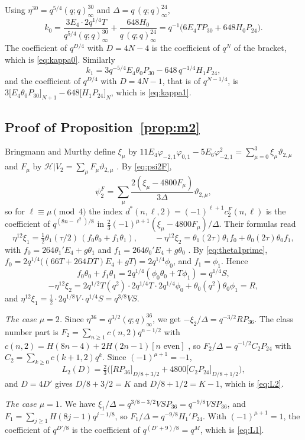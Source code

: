 \documentclass[11pt]{amsart}
\theoremstyle{definition}
\newcommand{\vt}{\vartheta}
\newcommand{\coef}[2]{\big[#1\big]_{#2}}
\begin{document}
Using $\eta^{30}=q^{5/4}(q;q)_\infty^{30}$ and $\Delta=q\,(q;q)_\infty^{24}$,
\[
k_0=\frac{3E_4\cdot2q^{1/4}T}{q^{5/4}(q;q)^{30}_\infty}+\frac{648H_0}{q\,(q;q)^{24}_\infty}=q^{-1}\big(6E_4TP_{30}+648H_0P_{24}\big).
\]
The coefficient of $q^{D/4}$ with $D=4N-4$ is the coefficient of $q^{N}$ of the bracket, which is \eqref{eq:kappa0}. Similarly
\[
k_1=3q^{-5/4}E_4\theta_0P_{30}-648\,q^{-1/4}H_1P_{24},
\]
and the coefficient of $q^{D/4}$ with $D=4N-1$, that is of $q^{N-1/4}$, is $3\coef{E_4\theta_0P_{30}}{N+1}-648\coef{H_1P_{24}}{N}$, which is \eqref{eq:kappa1}.

\subsection{Proof of Proposition~\ref{prop:m2}}
Bringmann and Murthy define $\xi_\mu$ by $11E_4\varphi_{-2,1}\varphi_{0,1}-5E_6\varphi_{-2,1}^2=\sum_{\mu=0}^3\xi_\mu\vt_{2,\mu}$ and $F_\mu$ by $\mathcal H|V_2=\sum_\mu F_\mu\vt_{2,\mu}$ \cite[(5.11), (6.1)]{BM13}. By \eqref{eq:psi2F},
\[
\psi_2^F=\sum_\mu\frac{2(\xi_\mu-4800F_\mu)}{3\Delta}\vt_{2,\mu},
\]
so for $\ell\equiv\mu\pmod4$ the index $d^*(n,\ell,2)=(-1)^{\ell+1}c^F_2(n,\ell)$ is the coefficient of $q^{(8n-\ell^2)/8}$ in $\frac23(-1)^{\mu+1}(\xi_\mu-4800F_\mu)/\Delta$. Their formulas \cite[(6.4), (6.5)]{BM13} read
\[
\eta^{12}\xi_1=\tfrac12\theta_1(\tau/2)\,(f_0\theta_0+f_1\theta_1),\qquad -\eta^{12}\xi_2=\theta_1(2\tau)\theta_1f_0+\theta_0(2\tau)\theta_0f_1,
\]
with $f_0=264\theta_1'E_4+g\theta_1$ and $f_1=264\theta_0'E_4+g\theta_0$ \cite[(5.2), (5.3)]{BM13}. By \eqref{eq:theta1prime}, $f_0=2q^{1/4}\big((66T+264DT)E_4+gT\big)=2q^{1/4}\phi_0$, and $f_1=\phi_1$. Hence
\[
f_0\theta_0+f_1\theta_1=2q^{1/4}(\phi_0\theta_0+T\phi_1)=q^{1/4}S,
\]
\[
-\eta^{12}\xi_2=2q^{1/2}T(q^2)\cdot2q^{1/4}T\cdot2q^{1/4}\phi_0+\theta_0(q^2)\theta_0\phi_1=R,
\]
and $\eta^{12}\xi_1=\frac12\cdot2q^{1/8}V\cdot q^{1/4}S=q^{3/8}VS$.

\emph{The case $\mu=2$.} Since $\eta^{36}=q^{3/2}(q;q)^{36}_\infty$, we get $-\xi_2/\Delta=q^{-3/2}RP_{36}$. The class number part is $F_2=\sum_{n\ge1}c(n,2)q^{n-1/2}$ with $c(n,2)=H(8n-4)+2H(2n-1)[n\text{ even}]$ \cite[(5.11)]{BM13}, so $F_2/\Delta=q^{-1/2}C_2P_{24}$ with $C_2=\sum_{k\ge0}c(k+1,2)q^k$. Since $(-1)^{\mu+1}=-1$,
\[
L_2(D)=\tfrac23\Big(\coef{RP_{36}}{D/8+3/2}+4800\coef{C_2P_{24}}{D/8+1/2}\Big),
\]
and $D=4D'$ gives $D/8+3/2=K$ and $D/8+1/2=K-1$, which is \eqref{eq:L2}.

\emph{The case $\mu=1$.} We have $\xi_1/\Delta=q^{3/8-3/2}VSP_{36}=q^{-9/8}VSP_{36}$, and $F_1=\sum_{j\ge1}H(8j-1)q^{j-1/8}$, so $F_1/\Delta=q^{-9/8}H_1'P_{24}$. With $(-1)^{\mu+1}=1$, the coefficient of $q^{D'/8}$ is the coefficient of $q^{(D'+9)/8}=q^M$, which is \eqref{eq:L1}.
\end{document}
